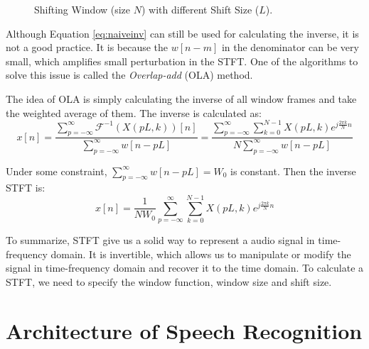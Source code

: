 \documentclass[11pt,a4paper]{report}
\begin{document}
\begin{figure}[thbp]
  \centering
  
  \caption{Shifting Window (size $N$) with different Shift Size ($L$).}
  \label{fig:window}
\end{figure}

Although Equation \ref{eq:naiveinv} can still be used for calculating the inverse, it is not a good practice. It is because the $w[n-m]$ in the denominator can be very small, which amplifies small perturbation in the STFT. One of the algorithms to solve this issue is called the \textit{Overlap-add} (OLA) method\cite{crochiere_weighted_1980}.

The idea of OLA is simply calculating the inverse of all window frames and take the weighted average of them. The inverse is calculated as:
\begin{equation}
  x[n] = \frac{\sum_{p=-\infty}^{\infty} \mathcal{F}^{-1}(X(pL,k))[n]}{\sum_{p=-\infty}^{\infty} w[n-pL]}
  = \frac{\sum_{p=-\infty}^{\infty} \sum_{k=0}^{N-1} X(pL,k)e^{j \frac{2\pi k}{N} n}}{N\sum_{p=-\infty}^{\infty} w[n-pL]}
\end{equation}

Under some constraint, $\sum_{p=-\infty}^{\infty} w[n-pL] = W_0$ is constant. Then the inverse STFT is:
\begin{equation}
  x[n] = \frac{1}{NW_0} \sum_{p=-\infty}^{\infty} \sum_{k=0}^{N-1} X(pL,k)e^{j \frac{2\pi k}{N} n} 
  \label{eq:olainv}
\end{equation}

To summarize, STFT give us a solid way to represent a audio signal in time-frequency domain. It is invertible, which allows us to manipulate or modify the signal in time-frequency domain and recover it to the time domain. To calculate a STFT, we need to specify the window function, window size and shift size.

\chapter {Architecture of Speech Recognition}
\label {sec:architecture}
\end{document}
